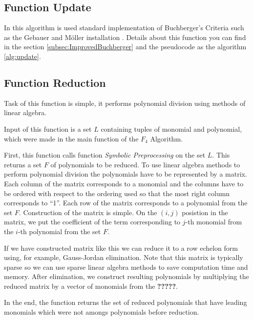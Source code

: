 \subsection{Function Update}
In this algorithm is used standard implementation of Buchberger's Criteria such as the Gebauer and M\"oller installation \cite{Gebauer-Moller88}. Details about this function you can find in the section \ref{subsec:ImprovedBuchberger} and the pseudocode as the algorithm \ref{alg:update}.

\subsection{Function Reduction}
Task of this function is simple, it performs polynomial division using methods of linear algebra.

Input of this function is a set $L$ containing tuples of monomial and polynomial, which were made in the main function of the $F_4$ Algorithm.

First, this function calls function \textit{Symbolic Preprocessing} on the set $L$. This returns a set $F$ of polynomials to be reduced. To use linear algebra methods to perform polynomial division the polynomials have to be represented by a matrix. Each column of the matrix corresponds to a monomial and the columns have to be ordered with respect to the ordering used so that the most right column corresponds to ``1''. Each row of the matrix corresponds to a polynomial from the set $F$. Construction of the matrix is simple. On the $(i, j)$ posistion in the matrix, we put the coefficient of the term corresponding to $j$-th monomial from the $i$-th polynomial from the set $F$.

If we have constructed matrix like this we can reduce it to a row echelon form using, for example, Gauss-Jordan elimination. Note that this matrix is typically sparse so we can use sparse linear algebra methods to save computation time and memory. After elimination, we construct resulting polynomials by multiplying the reduced matrix by a vector of monomials from the \textbf{?????}.

In the end, the function returns the set of reduced polynomials that have leading monomials which were not amongs polynomials before reduction.

